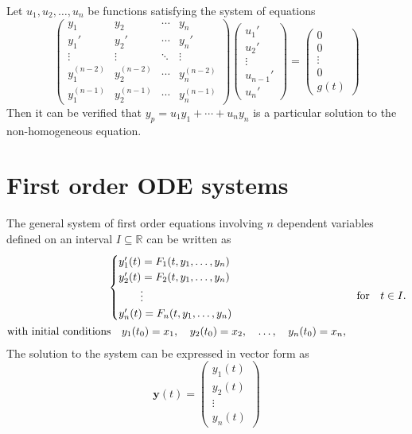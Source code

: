 \documentclass[10pt,UTF8]{article}
\renewcommand{\vec}[1]{\bm{#1}}
\theoremstyle{definition}
\newtheorem{definition inner}{Definition}[section]
\theoremstyle{definition}
\newtheorem{theorem inner}{Theorem}[section]
\theoremstyle{definition}
\newtheorem*{proof inner}{\textit{Proof}}
\theoremstyle{plain}
\newtheorem{tip inner}{Tip}[section]
\theoremstyle{remark}
\begin{document}
Let \(u_1, u_2, \ldots, u_n\) be functions satisfying the system of equations
\begin{equation*}
  \begin{pmatrix}
    y_1 & y_2 & \cdots & y_n \\
    y_1' & y_2' & \cdots & y_n' \\
    \vdots & \vdots & \ddots & \vdots \\
    y_1^{(n-2)} & y_2^{(n-2)} & \cdots & y_n^{(n-2)} \\
    y_1^{(n-1)} & y_2^{(n-1)} & \cdots & y_n^{(n-1)}
  \end{pmatrix}
  \begin{pmatrix}
    u_1' \\
    u_2' \\
    \vdots \\
    u_{n-1}' \\
    u_n'
  \end{pmatrix} =
  \begin{pmatrix}
    0 \\
    0 \\
    \vdots \\
    0 \\
    g(t)
  \end{pmatrix}
\end{equation*}
Then it can be verified that \(y_p = u_1 y_1 + \cdots + u_n y_n\)
is a particular solution to the non-homogeneous equation.

\section{First order ODE systems}

The general system of first order equations involving
\(n\) dependent variables defined on an interval \(I \subseteq \mathbb{R}\)
can be written as
\begin{equation}
  \begin{gathered}
    \begin{cases}
      y_1'(t) = F_1(t, y_1, \ldots, y_n) \\
      y_2'(t) = F_2(t, y_1, \ldots, y_n) \\
      \qquad\vdots \\
      y_n'(t) = F_n(t, y_1, \ldots, y_n)
    \end{cases} \\
    \text{with initial conditions}\quad
    y_1(t_0) = x_1, \quad
    y_2(t_0) = x_2, \quad
    \ldots, \quad
    y_n(t_0) = x_n,
  \end{gathered}
  \qfor t\in I.
  \label{eq: system of 1st order ODEs}
\end{equation}
The solution to the system can be expressed in vector form as
\begin{equation*}
  \vec{y}(t) =
  \begin{pmatrix}
    y_1(t) \\
    y_2(t) \\
    \vdots \\
    y_n(t)
  \end{pmatrix}
\end{equation*}
\end{document}
